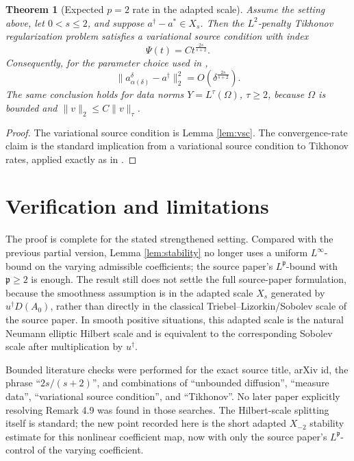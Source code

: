 \documentclass[11pt]{article}
\newtheorem{theorem}{Theorem}
\newcommand{\fp}{\mathfrak p}
\begin{document}
\begin{theorem}[Expected \(p=2\) rate in the adapted scale]
Assume the setting above, let \(0<s\leq2\), and suppose
\(a^\dagger-a^*\in X_s\). Then the \(L^2\)-penalty Tikhonov regularization
problem satisfies a variational source condition with index
\[
  \Psi(t)=C t^{\frac{2s}{s+2}} .
\]
Consequently, for the parameter choice used in
\cite[Corollary 3.2]{ChenYousept2020},
\[
  \|a^\delta_{\alpha(\delta)}-a^\dagger\|_2^2
  =O\!\left(\delta^{\frac{2s}{s+2}}\right).
\]
The same conclusion holds for data norms \(Y=L^\tau(\Omega)\), \(\tau\geq2\),
because \(\Omega\) is bounded and \(\|v\|_2\leq C\|v\|_\tau\).
\end{theorem}

\begin{proof}
The variational source condition is Lemma \ref{lem:vsc}. The convergence-rate
claim is the standard implication from a variational source condition to
Tikhonov rates, applied exactly as in \cite[Corollary 3.2]{ChenYousept2020}.
\end{proof}

\section*{Verification and limitations}

The proof is complete for the stated strengthened setting. Compared with the
previous partial version, Lemma \ref{lem:stability} no longer uses a uniform
\(L^\infty\)-bound on the varying admissible coefficients; the source paper's
\(L^\fp\)-bound with \(\fp\ge2\) is enough. The result still does not settle
the full source-paper formulation, because the smoothness assumption is in the
adapted scale \(X_s\) generated by \(u^\dagger D(A_0)\), rather than directly
in the classical Triebel--Lizorkin/Sobolev scale of the source paper. In smooth
positive situations, this adapted scale is the natural Neumann elliptic Hilbert
scale and is equivalent to the corresponding Sobolev scale after multiplication
by \(u^\dagger\).

Bounded literature checks were performed for the exact source title, arXiv id,
the phrase ``\(2s/(s+2)\)'', and combinations of ``unbounded diffusion'',
``measure data'', ``variational source condition'', and ``Tikhonov''. No later
paper explicitly resolving Remark 4.9 was found in those searches. The
Hilbert-scale splitting itself is standard; the new point recorded here is the
short adapted \(X_{-2}\) stability estimate for this nonlinear coefficient map,
now with only the source paper's \(L^\fp\)-control of the varying coefficient.
\end{document}
